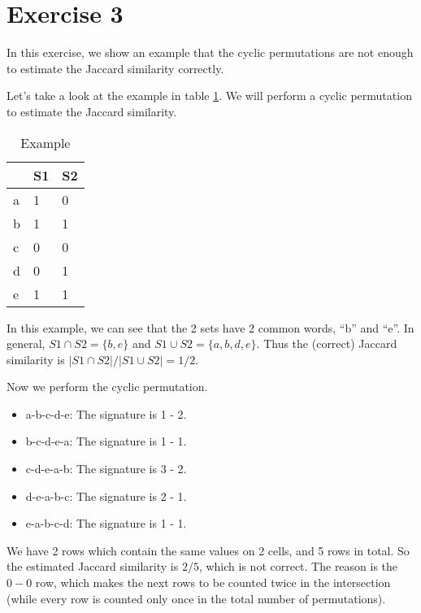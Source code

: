 \section*{Exercise 3}
In this exercise, we show an example that the cyclic permutations are not enough to estimate the Jaccard similarity correctly.

Let's take a look at the example in table \ref{example}. We will perform a cyclic permutation to estimate the Jaccard similarity.

\begin{table}[h]
  \centering
\caption{Example}
\label{example}
\begin{tabular}{@{}lll@{}}
  \toprule
  & S1 & S2 \\ \midrule
a & 1  & 0  \\
b & 1  & 1  \\
c & 0  & 0  \\
d & 0  & 1  \\
e & 1  & 1  \\ \bottomrule
\end{tabular}
\end{table}

In this example, we can see that the 2 sets have 2 common words, ``b'' and ``e''. In general, $S1 \cap S2 = \{b,e\}$ and $S1 \cup S2 = \{a,b,d,e\}$. Thus the (correct) Jaccard similarity is $|S1 \cap S2| / |S1 \cup S2| = 1/2$.

Now we perform the cyclic permutation. 

\begin{itemize}
    \item a-b-c-d-e: The signature is 1 - 2.
    \item b-c-d-e-a: The signature is 1 - 1.
    \item c-d-e-a-b: The signature is 3 - 2.
    \item d-e-a-b-c: The signature is 2 - 1.
    \item e-a-b-c-d: The signature is 1 - 1.
\end{itemize}

We have 2 rows which contain the same values on 2 cells, and 5 rows in total. So the estimated Jaccard similarity is $2/5$, which is not correct. The reason is the $0 - 0$ row, which makes the next rows to be counted twice in the intersection (while every row is counted only once in the total number of permutations).

